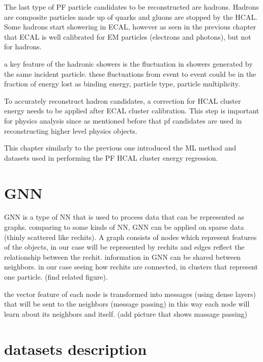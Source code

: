 
The last type of PF particle candidates to be reconstructed are hadrons. Hadrons are composite particles made up of quarks and gluons are stopped by the HCAL. Some hadrons start showering in ECAL, however as seen in the previous chapter that ECAL is well calibrated for EM particles (electrons and photons), but not for hadrons.

a key feature of the hadronic showers is the fluctuation in showers generated by the same incident particle. these fluctuations from event to event could be in the fraction of energy lost as binding energy, particle type, particle multiplicity.

To accurately reconstruct hadron candidates, a correction for HCAL cluster energy needs to be applied after ECAL cluster calibration. This step is important for physics analysis since as mentioned before that pf candidates are used in reconstructing higher level physics objects.

This chapter similarly to the previous one introduced the ML method and datasets used in performing the PF HCAL cluster energy regression.  

\section{GNN} %

GNN is a type of NN that is used to process data that can be represented as graphs. comparing to some kinds of NN, GNN can be applied on sparse data (thinly scattered like rechits). A graph consists of nodes which represent features of the objects, in our case will be represented by rechits and edges reflect the relationship between the rechit. information in GNN can be shared between neighbors. in our case seeing how rechits are connected, in clusters that represent one particle. (find related figure).

the vector feature of each node is transformed into messages (using dense layers) that will be sent to the neighbors (message passing) in this way each node will learn about its neighbors and itself. (add picture that shows massage passing) 



\section{datasets description}

